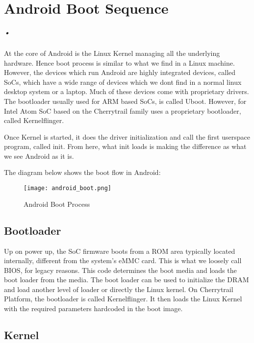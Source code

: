 

\chapter{Android Boot Sequence}
\label{android_boot}
\paragraph*{•}

\hspace{8mm} 

\noindent At the core of Android is the Linux Kernel managing all the underlying hardware. Hence boot process is
similar to what we find in a Linux machine. However, the devices which run Android are highly
integrated devices, called SoCs, which have a wide range of devices which we dont find in
a normal linux desktop system or a laptop. Much of these devices come with proprietary drivers.
The bootloader usually used for ARM based SoCs, is called Uboot. However, for Intel Atom SoC
based on the Cherrytrail family uses a proprietary bootloader, called Kernelflinger.

Once Kernel is started, it does the driver initialization and call the first userspace program,
called init. From here, what init loads is making the difference as what we see Android as it is.

The diagram below shows the boot flow in Android:


\begin{figure}[h]
  \centering
    \texttt{[image: android\_boot.png]}
    \caption{Android Boot Process}
    \label{fig:android_boot}
\end{figure}

\clearpage
\section{Bootloader}

Up on power up, the SoC firmware boots from a ROM area typically located internally,
different from the system's eMMC card. This is what we loosely call BIOS, for legacy
reasons. This code determines the boot media and loads the boot loader from the media.
The boot loader can be used to initialize the DRAM and load another level of loader
or directly the Linux kernel. On Cherrytrail Platform, the bootloader is called Kernelflinger.
It then loads the Linux Kernel with the required parameters hardcoded in the boot image.

\section{Kernel}

